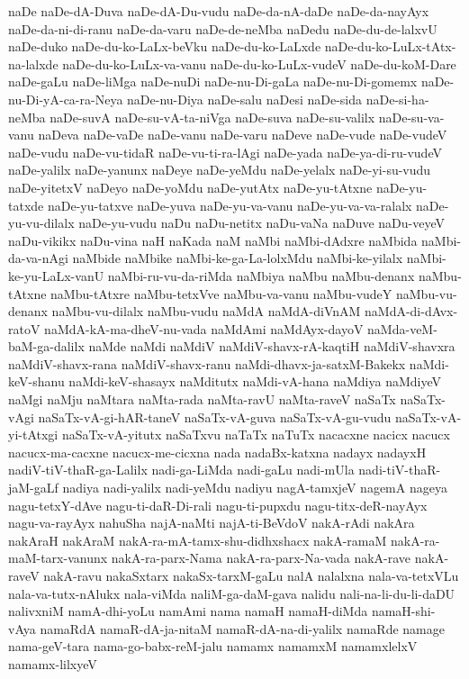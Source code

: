 {naDe
naDe-dA-Duva
naDe-dA-Du-vudu
naDe-da-nA-daDe
naDe-da-nayAyx
naDe-da-ni-di-ranu
naDe-da-varu
naDe-de-neMba
naDedu
naDe-du-de-lalxvU
naDe-duko
naDe-du-ko-LaLx-beVku
naDe-du-ko-LaLxde
naDe-du-ko-LuLx-tAtx-na-lalxde
naDe-du-ko-LuLx-va-vanu
naDe-du-ko-LuLx-vudeV
naDe-du-koM-Dare
naDe-gaLu
naDe-liMga
naDe-nuDi
naDe-nu-Di-gaLa
naDe-nu-Di-gomemx
naDe-nu-Di-yA-ca-ra-Neya
naDe-nu-Diya
naDe-salu
naDesi
naDe-sida
naDe-si-ha-neMba
naDe-suvA
naDe-su-vA-ta-niVga
naDe-suva
naDe-su-valilx
naDe-su-va-vanu
naDeva
naDe-vaDe
naDe-vanu
naDe-varu
naDeve
naDe-vude
naDe-vudeV
naDe-vudu
naDe-vu-tidaR
naDe-vu-ti-ra-lAgi
naDe-yada
naDe-ya-di-ru-vudeV
naDe-yalilx
naDe-yanunx
naDeye
naDe-yeMdu
naDe-yelalx
naDe-yi-su-vudu
naDe-yitetxV
naDeyo
naDe-yoMdu
naDe-yutAtx
naDe-yu-tAtxne
naDe-yu-tatxde
naDe-yu-tatxve
naDe-yuva
naDe-yu-va-vanu
naDe-yu-va-va-ralalx
naDe-yu-vu-dilalx
naDe-yu-vudu
naDu
naDu-netitx
naDu-vaNa
naDuve
naDu-veyeV
naDu-vikikx
naDu-vina
naH
naKada
naM
naMbi
naMbi-dAdxre
naMbida
naMbi-da-va-nAgi
naMbide
naMbike
naMbi-ke-ga-La-lolxMdu
naMbi-ke-yilalx
naMbi-ke-yu-LaLx-vanU
naMbi-ru-vu-da-riMda
naMbiya
naMbu
naMbu-denanx
naMbu-tAtxne
naMbu-tAtxre
naMbu-tetxVve
naMbu-va-vanu
naMbu-vudeY
naMbu-vu-denanx
naMbu-vu-dilalx
naMbu-vudu
naMdA
naMdA-diVnAM
naMdA-di-dAvx-ratoV
naMdA-kA-ma-dheV-nu-vada
naMdAmi
naMdAyx-dayoV
naMda-veM-baM-ga-dalilx
naMde
naMdi
naMdiV
naMdiV-shavx-rA-kaqtiH
naMdiV-shavxra
naMdiV-shavx-rana
naMdiV-shavx-ranu
naMdi-dhavx-ja-satxM-Bakekx
naMdi-keV-shanu
naMdi-keV-shasayx
naMditutx
naMdi-vA-hana
naMdiya
naMdiyeV
naMgi
naMju
naMtara
naMta-rada
naMta-ravU
naMta-raveV
naSaTx
naSaTx-vAgi
naSaTx-vA-gi-hAR-taneV
naSaTx-vA-guva
naSaTx-vA-gu-vudu
naSaTx-vA-yi-tAtxgi
naSaTx-vA-yitutx
naSaTxvu
naTaTx
naTuTx
nacacxne
nacicx
nacucx
nacucx-ma-cacxne
nacucx-me-cicxna
nada
nadaBx-katxna
nadayx
nadayxH
nadiV-tiV-thaR-ga-Lalilx
nadi-ga-LiMda
nadi-gaLu
nadi-mUla
nadi-tiV-thaR-jaM-gaLf
nadiya
nadi-yalilx
nadi-yeMdu
nadiyu
nagA-tamxjeV
nagemA
nageya
nagu-tetxY-dAve
nagu-ti-daR-Di-rali
nagu-ti-pupxdu
nagu-titx-deR-nayAyx
nagu-va-rayAyx
nahuSha
najA-naMti
najA-ti-BeVdoV
nakA-rAdi
nakAra
nakAraH
nakAraM
nakA-ra-mA-tamx-shu-didhxshacx
nakA-ramaM
nakA-ra-maM-tarx-vanunx
nakA-ra-parx-Nama
nakA-ra-parx-Na-vada
nakA-rave
nakA-raveV
nakA-ravu
nakaSxtarx
nakaSx-tarxM-gaLu
nalA
nalalxna
nala-va-tetxVLu
nala-va-tutx-nAlukx
nala-viMda
naliM-ga-daM-gava
nalidu
nali-na-li-du-li-daDU
nalivxniM
namA-dhi-yoLu
namAmi
nama
namaH
namaH-diMda
namaH-shi-vAya
namaRdA
namaR-dA-ja-nitaM
namaR-dA-na-di-yalilx
namaRde
namage
nama-geV-tara
nama-go-babx-reM-jalu
namamx
namamxM
namamxlelxV
namamx-lilxyeV
}
